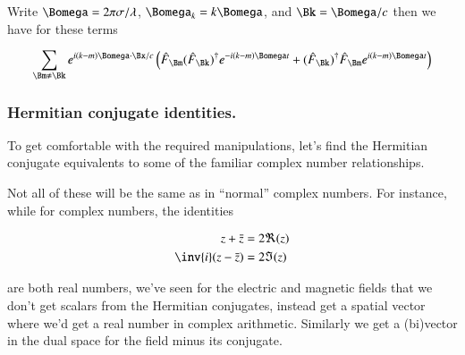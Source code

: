 Write $\Bomega = 2 \pi \sigma / \lambda$, $\Bomega_k = k \Bomega$, and $\Bk = \Bomega/c$ then we have for these terms

\begin{align*}
\sum_{\Bm \ne \Bk} 
e^{ i (k-m) \Bomega \cdot \Bx/c } \left( 
\hat{F}_{\Bm} (\hat{F}_{\Bk})^{\dagger} e^{ -i (k-m) \Bomega t }
+
(\hat{F}_{\Bk})^{\dagger} \hat{F}_{\Bm} e^{ i (k-m)\Bomega t }
\right)
\\
\end{align*}

\subsubsection{Hermitian conjugate identities. }

To get comfortable with the required manipulations, let's 
find the Hermitian conjugate equivalents to some of the familiar complex number relationships.

Not all of these will be the same as in ``normal'' complex numbers.  For instance, while for complex numbers, the identities

\begin{align*}
z + \bar{z} &= 2 \Re(z) \\
\inv{i}( z - \bar{z} ) &= 2 \Im(z)
\end{align*}

are both real numbers, we've seen for the electric and magnetic fields that we don't get scalars from the Hermitian conjugates, instead get a spatial vector where we'd get a real number in complex arithmetic.  Similarly we get a (bi)vector in the dual
space for the field minus its conjugate.

